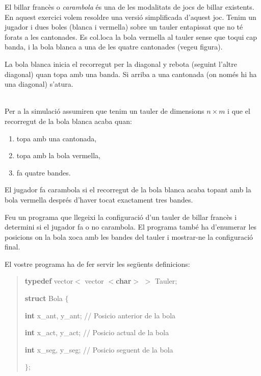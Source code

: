 
\Statement

El billar francès o \emph{carambola} és una de les modalitats de jocs de billar existents. En aquest exercici  volem resoldre una versió simplificada d'aquest joc. 
Tenim un jugador i dues boles (blanca i vermella) sobre un tauler entapissat que no té forats a les cantonades. Es col.loca la bola vermella al tauler sense que toqui cap banda, i la bola blanca a una de les quatre  cantonades (vegeu figura).

La bola blanca inicia el recorregut per la diagonal y rebota (seguint l'altre diagonal) quan topa amb una banda.  Si arriba a una cantonada (on nom\'{e}s  hi ha una diagonal) s'atura.


\ \\ 
Per a la simulació assumiren que tenim un tauler de dimensions $n\times m$ i que el recorregut de la  bola blanca acaba quan:

\begin{enumerate}
    \item topa amb una cantonada, 
    \item topa amb la bola vermella,  
    \item fa quatre bandes.
\end{enumerate}

El jugador fa carambola si el recorregut de la bola blanca acaba topant amb la bola vermella després d'haver tocat exactament tres bandes. 

\smallskip
Feu un programa que llegeixi la configuració d'un tauler de billar francès i determini si el jugador fa o no carambola. El programa també ha d'enumerar les posicions on la bola xoca amb les bandes del tauler i mostrar-ne la configuració final. 


El vostre programa ha de fer servir les seg\"{u}ents definicions:

\begin{quote}

\textbf{typedef} vector$<$ vector $<$\textbf{char}$>$ $>$ Tauler;

\textbf{struct}  Bola $\{$ 

\hspace{10pt} \textbf{int} x\_ant, y\_ant;\hspace{10pt} // Posicio anterior de la bola

\hspace{10pt} \textbf{int} x\_act, y\_act;\hspace{11pt} // Posicio actual de la bola

\hspace{10pt} \textbf{int} x\_seg, y\_seg;\hspace{10pt} // Posicio seguent de la bola

$\}$;

\end{quote}

